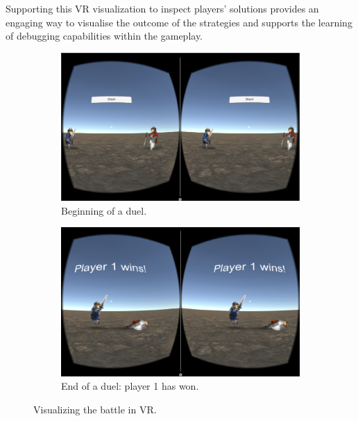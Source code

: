 Supporting this \ac{VR} visualization to inspect players' solutions provides an engaging way to visualise the outcome of the strategies and supports the learning of debugging capabilities within the gameplay.

\begin{figure}[ht!] 
  \begin{subfigure}[b]{0.48\linewidth}
    \centering
    \includegraphics[width=1.02\linewidth]{images/c5/start-VR.png} 
    \caption{Beginning of a duel.}\label{fig:6a}
  \end{subfigure}\hfill
  \begin{subfigure}[b]{0.48\linewidth}
    \centering
    \includegraphics[width=1.02\linewidth]{images/c5/final-VR.png} 
    \caption{End of a duel: player 1 has won.}\label{fig:6b}
  \end{subfigure}
  \caption{Visualizing the battle in \ac{VR}.}
\end{figure}

